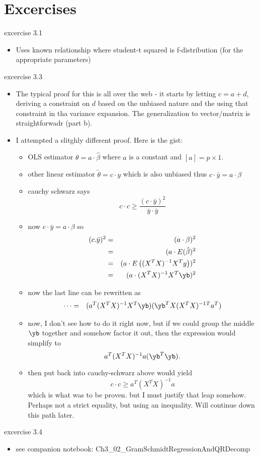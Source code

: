 \begin{itemize}
\begin{itemize}
     \end{itemize}
\end{itemize}

\section{Excercises}

excercise 3.1
\begin{itemize}
  \item Uses known relationship where student-t squared is f-distribution (for the appropriate parameters)
\end{itemize}

excercise 3.3
\begin{itemize}
  \item The typical proof for this is all over the web - it starts by letting $c = a + d$, deriving a constraint on $d$ based on the unbiased nature and the using that constraint in tha variance expansion. The generalization to vector/matrix is straightforwadr (part b).
  \item I attempted a slitghly different proof. Here is the gist:
  \begin{itemize}
    \item OLS estimator $\theta = a \cdot \hat{\beta}$ where $a$ is a constant and $[a] = p\times 1$.
    \item other linear estimator $\tilde{\theta} = c \cdot y$ which is also unbiased
      \subitem thus $c \cdot \bar{y} = a \cdot \beta$
    \item cauchy schwarz says
      $$ c\cdot c \geq \frac{(c \cdot \bar{y})^2}{\bar{y}\cdot \bar{y}} $$
    \item now $c\cdot\bar{y} = a \cdot \beta$ so 
      \begin{eqnarray}
	(c.\bar{y})^2 &=& (a \cdot \beta)^2 \\
			&=& (a \cdot E(\hat{\beta})^2 \\
			  &=& (a \cdot E\left((X^TX)^{-1}X^Ty\right))^2 \\
			  &=& (a \cdot (X^TX)^{-1}X^T\yb)^2 
      \end{eqnarray}
    \item now the last line can be rewritten as
      \begin{eqnarray}
	\cdots &=& (a^T(X^TX)^{-1}X^T\yb)(\yb^TX(X^TX)^{-1}{}^Ta^T)
      \end{eqnarray}
    \item now, I don't see how to do it right now, but if we could group the middle $\yb$ together and somehow factor it out, then the expression would simplify to 
      $$a^T(X^TX)^{-1}a(\yb^T\yb).$$
    \item then put back into cauchy-schwarz above would yield
      $$c\cdot c \geq a^T(X^TX)^{-1}a$$
      which is what was to be proven. but I must justify that leap somehow. Perhaps not a strict equality, but using an inequality. Will continue down this path later.
  \end{itemize}
\end{itemize}

excercise 3.4
\begin{itemize}
  \item see companion notebook: Ch3\_02\_GramSchmidtRegressionAndQRDecomp
\end{itemize}




